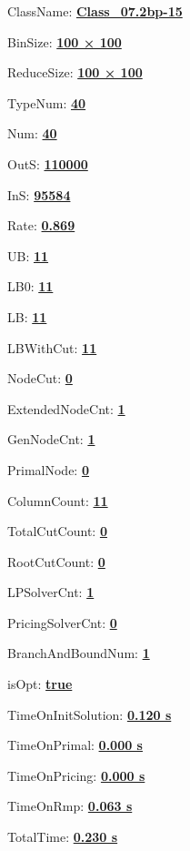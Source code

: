 \documentclass[11pt]{article}
\begin{document}
\pagestyle{empty}


ClassName: \underline{\textbf{Class_07.2bp-15}}
\par
BinSize: \underline{\textbf{100 × 100}}
\par
ReduceSize: \underline{\textbf{100 × 100}}
\par
TypeNum: \underline{\textbf{40}}
\par
Num: \underline{\textbf{40}}
\par
OutS: \underline{\textbf{110000}}
\par
InS: \underline{\textbf{95584}}
\par
Rate: \underline{\textbf{0.869}}
\par
UB: \underline{\textbf{11}}
\par
LB0: \underline{\textbf{11}}
\par
LB: \underline{\textbf{11}}
\par
LBWithCut: \underline{\textbf{11}}
\par
NodeCut: \underline{\textbf{0}}
\par
ExtendedNodeCnt: \underline{\textbf{1}}
\par
GenNodeCnt: \underline{\textbf{1}}
\par
PrimalNode: \underline{\textbf{0}}
\par
ColumnCount: \underline{\textbf{11}}
\par
TotalCutCount: \underline{\textbf{0}}
\par
RootCutCount: \underline{\textbf{0}}
\par
LPSolverCnt: \underline{\textbf{1}}
\par
PricingSolverCnt: \underline{\textbf{0}}
\par
BranchAndBoundNum: \underline{\textbf{1}}
\par
isOpt: \underline{\textbf{true}}
\par
TimeOnInitSolution: \underline{\textbf{0.120 s}}
\par
TimeOnPrimal: \underline{\textbf{0.000 s}}
\par
TimeOnPricing: \underline{\textbf{0.000 s}}
\par
TimeOnRmp: \underline{\textbf{0.063 s}}
\par
TotalTime: \underline{\textbf{0.230 s}}
\par
\newpage


\end{document}
